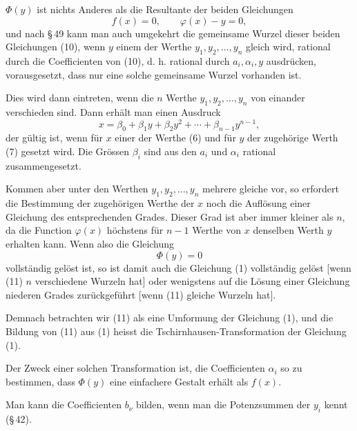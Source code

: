\documentclass[11pt]{article}
\begin{document}
$\Phi(y)$ ist nichts Anderes als die Resultante der beiden Gleichungen
\begin{equation}
f(x)=0,\qquad \varphi(x)-y=0,
\tag{10}
\end{equation}
und nach \S\,49 kann man auch umgekehrt die gemeinsame Wurzel dieser beiden Gleichungen (10), wenn $y$ einem der Werthe $y_1,y_2,\ldots,y_n$ gleich wird, rational durch die Coefficienten von (10), d. h. rational durch $a_i,\alpha_i,y$ ausdrücken, vorausgesetzt, dass nur eine solche gemeinsame Wurzel vorhanden ist.

Dies wird dann eintreten, wenn die $n$ Werthe $y_1,y_2,\ldots,y_n$ von einander verschieden sind. Dann erhält man einen Ausdruck
\[
x=\beta_0+\beta_1y+\beta_2y^2+\cdots+\beta_{n-1}y^{n-1},
\]
der gültig ist, wenn für $x$ einer der Werthe (6) und für $y$ der zugehörige Werth (7) gesetzt wird. Die Grössen $\beta_i$ sind aus den $a_i$ und $\alpha_i$ rational zusammengesetzt.

Kommen aber unter den Werthen $y_1,y_2,\ldots,y_n$ mehrere gleiche vor, so erfordert die Bestimmung der zugehörigen Werthe der $x$ noch die Auflösung einer Gleichung des entsprechenden Grades. Dieser Grad ist aber immer kleiner als $n$, da die Function $\varphi(x)$ höchstens für $n-1$ Werthe von $x$ denselben Werth $y$ erhalten kann. Wenn also die Gleichung
\begin{equation}
\Phi(y)=0
\tag{11}
\end{equation}
vollständig gelöst ist, so ist damit auch die Gleichung (1) vollständig gelöst [wenn (11) $n$ verschiedene Wurzeln hat] oder wenigstens auf die Lösung einer Gleichung niederen Grades zurückgeführt [wenn (11) gleiche Wurzeln hat].

Demnach betrachten wir (11) als eine Umformung der Gleichung (1), und die Bildung von (11) aus (1) heisst die Tschirnhausen-Transformation der Gleichung (1).

Der Zweck einer solchen Transformation ist, die Coefficienten $\alpha_i$ so zu bestimmen, dass $\Phi(y)$ eine einfachere Gestalt erhält als $f(x)$.

Man kann die Coefficienten $b_\nu$ bilden, wenn man die Potenzsummen der $y_i$ kennt (\S\,42).
\end{document}
